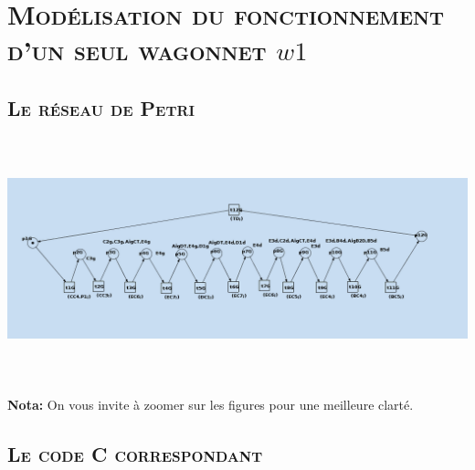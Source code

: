 \chapter{\textsc{ Modélisation du fonctionnement d'un seul wagonnet $w1$ }}
\section{\textsc{Le réseau de Petri}}
	
	\begin{center}
	\includegraphics[width=15cm, height=7cm]{w1.png}
	\label{fig1} 
	\end{center}
	
	\textbf{Nota:} On vous invite à zoomer sur les figures pour une meilleure clarté.  

\section{\textsc{Le code C correspondant}}

